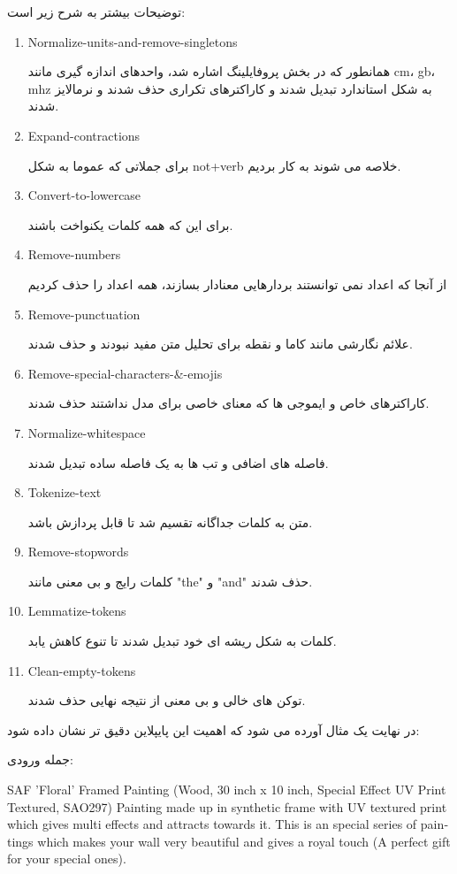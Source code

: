 \documentclass[a4paper,12pt]{article}
\begin{document}
توضیحات بیشتر به شرح زیر است:
\begin{enumerate}
	\item Normalize-units-and-remove-singletons
	
	همانطور که در بخش پروفایلینگ اشاره شد، واحدهای اندازه گیری مانند cm، gb، mhz به شکل استاندارد تبدیل شدند و کاراکترهای تکراری حذف شدند و نرمالایز شدند. 
	
	\item Expand-contractions
	
	برای جملاتی که عموما به شکل not+verb خلاصه می شوند به کار بردیم. 
	\item Convert-to-lowercase
	
	برای این که همه کلمات یکنواخت باشند.
	\item Remove-numbers
	
	از آنجا که اعداد نمی توانستند بردارهایی معنادار بسازند، همه اعداد را حذف کردیم
	\item Remove-punctuation
	
	علائم نگارشی مانند کاما و نقطه برای تحلیل متن مفید نبودند و حذف شدند.
	\item Remove-special-characters-\&-emojis
	
	کاراکترهای خاص و ایموجی ها که معنای خاصی برای مدل نداشتند حذف شدند.
	\item Normalize-whitespace
	
	فاصله های اضافی و تب ها به یک فاصله ساده تبدیل شدند.
	\item Tokenize-text
	
	متن به کلمات جداگانه تقسیم شد تا قابل پردازش باشد.
	\item Remove-stopwords
	
	کلمات رایج و بی معنی مانند "the" و "and" حذف شدند.
	\item Lemmatize-tokens
	
	کلمات به شکل ریشه ای خود تبدیل شدند تا تنوع کاهش یابد.
	\item Clean-empty-tokens
	
	توکن های خالی و بی معنی از نتیجه نهایی حذف شدند.
\end{enumerate}
در نهایت یک مثال آورده می شود که اهمیت این پایپلاین دقیق تر نشان داده شود:

جمله ورودی:
\begin{latin}
	SAF 'Floral' Framed Painting (Wood, 30 inch x 10 inch, Special Effect UV Print Textured, SAO297) Painting made up in synthetic frame with UV textured print which gives multi effects and attracts towards it. This is an special series of paintings which makes your wall very beautiful and gives a royal touch (A perfect gift for your special ones).
\end{latin}
\end{document}

